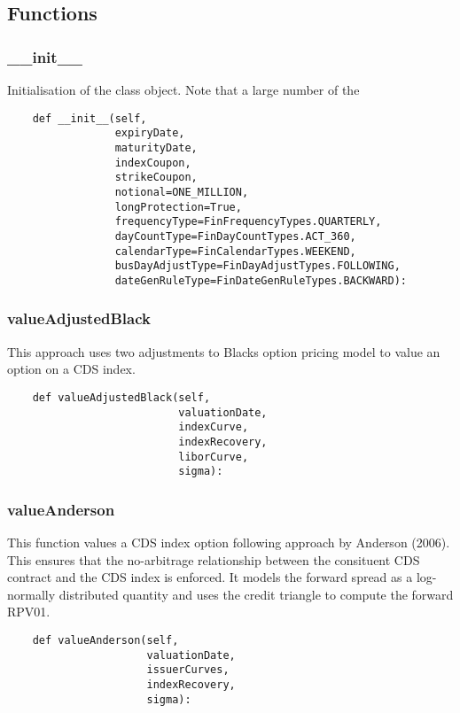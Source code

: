 \documentclass[twoside,11pt]{book}
\begin{document}
\subsection*{Functions}

\subsubsection*{{\bf \_\_init\_\_}}
Initialisation of the class object. Note that a large number of the 

\begin{lstlisting}
    def __init__(self,
                 expiryDate,
                 maturityDate,
                 indexCoupon,
                 strikeCoupon,
                 notional=ONE_MILLION,
                 longProtection=True,
                 frequencyType=FinFrequencyTypes.QUARTERLY,
                 dayCountType=FinDayCountTypes.ACT_360,
                 calendarType=FinCalendarTypes.WEEKEND,
                 busDayAdjustType=FinDayAdjustTypes.FOLLOWING,
                 dateGenRuleType=FinDateGenRuleTypes.BACKWARD):
\end{lstlisting}

\subsubsection*{{\bf valueAdjustedBlack}}
This approach uses two adjustments to Blacks option pricing model to value an option on a CDS index.  

\begin{lstlisting}
    def valueAdjustedBlack(self,
                           valuationDate,
                           indexCurve,
                           indexRecovery,
                           liborCurve,
                           sigma):
\end{lstlisting}

\subsubsection*{{\bf valueAnderson}}
This function values a CDS index option following approach by Anderson (2006). This ensures that the no-arbitrage relationship between the consituent CDS contract and the CDS index is enforced. It models the forward spread as a log-normally distributed quantity and uses the credit triangle to compute the forward RPV01.  

\begin{lstlisting}
    def valueAnderson(self,
                      valuationDate,
                      issuerCurves,
                      indexRecovery,
                      sigma):
\end{lstlisting}
\end{document}
